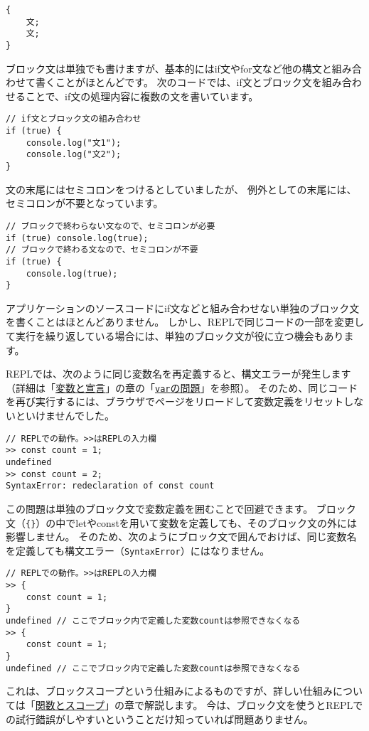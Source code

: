 \begin{lstlisting}
{
    文;
    文;
}
\end{lstlisting}

ブロック文は単独でも書けますが、基本的にはif文やfor文など他の構文と組み合わせて書くことがほとんどです。
次のコードでは、if文とブロック文を組み合わせることで、if文の処理内容に複数の文を書いています。

\begin{lstlisting}
// if文とブロック文の組み合わせ
if (true) {
    console.log("文1");
    console.log("文2");
}
\end{lstlisting}

文の末尾にはセミコロンをつけるとしていましたが、
例外として\textbf{}の末尾には、セミコロンが不要となっています。

\begin{lstlisting}
// ブロックで終わらない文なので、セミコロンが必要
if (true) console.log(true);
// ブロックで終わる文なので、セミコロンが不要
if (true) {
    console.log(true);
}
\end{lstlisting}

\begin{tcolorbox}[floatplacement=t,float,title=単独のブロック文の活用]\label{isolate-block-statement}

アプリケーションのソースコードにif文などと組み合わせない単独のブロック文を書くことはほとんどありません。
しかし、REPLで同じコードの一部を変更して実行を繰り返している場合には、単独のブロック文が役に立つ機会もあります。

REPLでは、次のように同じ変数名を再定義すると、構文エラーが発生します（詳細は「\hyperlink{variable-and-declaration}{変数と宣言}」の章の「\hyperlink{var-issues}{\texttt{var}の問題}」を参照）。
そのため、同じコードを再び実行するには、ブラウザでページをリロードして変数定義をリセットしないといけませんでした。

\begin{lstlisting}
// REPLでの動作。>>はREPLの入力欄
>> const count = 1;
undefined
>> const count = 2;
SyntaxError: redeclaration of const count
\end{lstlisting}

この問題は単独のブロック文で変数定義を囲むことで回避できます。
ブロック文（\texttt{\{\}}）の中でletやconstを用いて変数を定義しても、そのブロック文の外には影響しません。
そのため、次のようにブロック文で囲んでおけば、同じ変数名を定義しても構文エラー（\texttt{SyntaxError}）にはなりません。

\begin{lstlisting}
// REPLでの動作。>>はREPLの入力欄
>> {
    const count = 1;
}
undefined // ここでブロック内で定義した変数countは参照できなくなる
>> {
    const count = 1;
}
undefined // ここでブロック内で定義した変数countは参照できなくなる
\end{lstlisting}

これは、ブロックスコープという仕組みによるものですが、詳しい仕組みについては「\hyperlink{function-and-scope}{関数とスコープ}」の章で解説します。
今は、ブロック文を使うとREPLでの試行錯誤がしやすいということだけ知っていれば問題ありません。
\end{tcolorbox}

